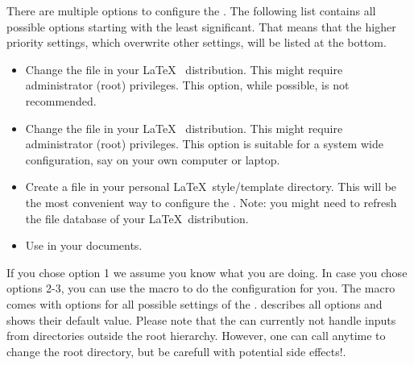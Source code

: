 \DescribeMacro{\skbconfig}
There are multiple options to configure the . The following list
contains all possible options starting with the least significant. That 
means that the higher priority settings, which overwrite other settings,
will be listed at the bottom.
\begin{itemize}
  \item Change the file  in your \LaTeX~
        distribution. This might require administrator (root)
        privileges. This option, while possible, is not recommended.
  \item Change the file  in your \LaTeX~
        distribution. This might require administrator (root)
        privileges. This option is suitable for a system wide 
        configuration, say on your own computer or laptop.
  \item Create a file  in your personal
        \LaTeX~style/template directory. This will be the most
        convenient way to configure the . Note: you might need
        to refresh the file database of your \LaTeX~distribution.
  \item Use \cmd{\skbconfig} in your documents.
\end{itemize}

If you chose option 1 we assume you know what you are doing. In case you
chose options 2-3, you can use the macro \cmd{\skbconfig} to do the configuration
for you. The macro comes with options for all possible settings of the .
 describes all options and shows their default value.
Please note that the  can currently not handle inputs from directories outside the root hierarchy. However, one can
call \cmd{\skbconfig} anytime to change the root directory, but be carefull with potential side effects!.

